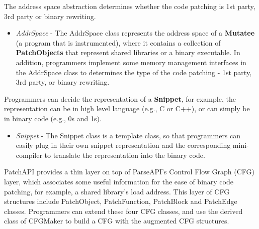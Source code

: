 The address space abstraction determines whether the code patching is 1st party,
3rd party or binary rewriting.
\begin{itemize}
\item \emph{AddrSpace} - The AddrSpace class represents the address space of a
  \textbf{Mutatee} (a program that is instrumented), where it contains a
  collection of \textbf{PatchObjects} that represent shared libraries or a
  binary executable. In addition, programmers implement some memory management
  interfaces in the AddrSpace class to determines the type of the code patching
  - 1st party, 3rd party, or binary rewriting.
\end{itemize}
Programmers can decide the representation of a \textbf{Snippet}, for example, the
representation can be in high level language (e.g., C or C++), or can simply be
in binary code (e.g., 0s and 1s).
\begin{itemize}
\item \emph{Snippet} - The Snippet class is a template class, so that programmers can
    easily plug in their own snippet representation and the corresponding
    mini-compiler to translate the representation into the binary code.
\end{itemize}
PatchAPI provides a thin layer on top of ParseAPI's Control Flow Graph (CFG)
layer, which associates some useful information for the ease of binary code
patching, for example, a shared library's load address. This layer of CFG
structures include PatchObject, PatchFunction, PatchBlock and PatchEdge classes.
Programmers can extend these four CFG classes, and use the derived class of
CFGMaker to build a CFG with the augmented CFG structures.

